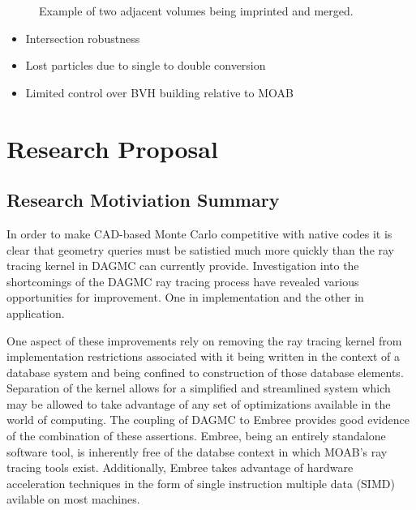 \documentclass[12pt, a4paper]{article}
\begin{document}
\begin{figure}
  \caption{Example of two adjacent volumes being imprinted and merged.}
\end{figure}


\begin{itemize}
\item Intersection robustness
\item Lost particles due to single to double conversion
\item Limited control over BVH building relative to MOAB
\end{itemize}

\section{Research Proposal}%
\label{research_proposal}

\subsection{Research Motiviation Summary}%
In order to make CAD-based Monte Carlo competitive with native codes it is clear that geometry queries must be satistied much more quickly than the ray tracing kernel in DAGMC can currently provide. Investigation into the shortcomings of the DAGMC ray tracing process have revealed various opportunities for improvement. One in implementation and the other in application.

One aspect of these improvements rely on removing the ray tracing kernel from implementation restrictions associated with it being written in the context of a database system and being confined to construction of those database elements. Separation of the kernel allows for a simplified and streamlined system which may be allowed to take advantage of any set of optimizations available in the world of computing. The coupling of DAGMC to Embree provides good evidence of the combination of these assertions. Embree, being an entirely standalone software tool, is inherently free of the databse context in which MOAB's ray tracing tools exist. Additionally, Embree takes advantage of hardware acceleration techniques in the form of single instruction multiple data (SIMD) avilable on most machines.
\end{document}
